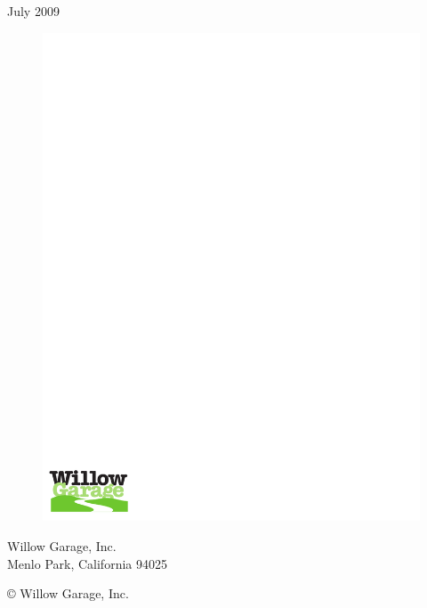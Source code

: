\date{}

\title{\vspace{1cm}{\huge ROS Manual}}

\author{Morgan Quigley, Ken Conley, Eric Berger, Brian Gerkey, The Wiki \\
\texttt{mquigley@cs.stanford.edu, \{kwc,berger,gerkey\}@willowgarage.com}}

\maketitle
\thispagestyle{empty}

\begin{center}

\vspace{1cm}

{\large July 2009}

\vspace{3cm}

\begin{figure}[!h]
  \centering
  \includegraphics[width=0.27\linewidth,viewport= 10 10 140 90, clip]{WG_logo_on_white}
\end{figure}

\vspace{0.25cm} {\large
  Willow Garage, Inc.\\
  Menlo Park, California 94025\\
}

\vspace{1cm}

\copyright \/ Willow Garage, Inc.

\end{center}


